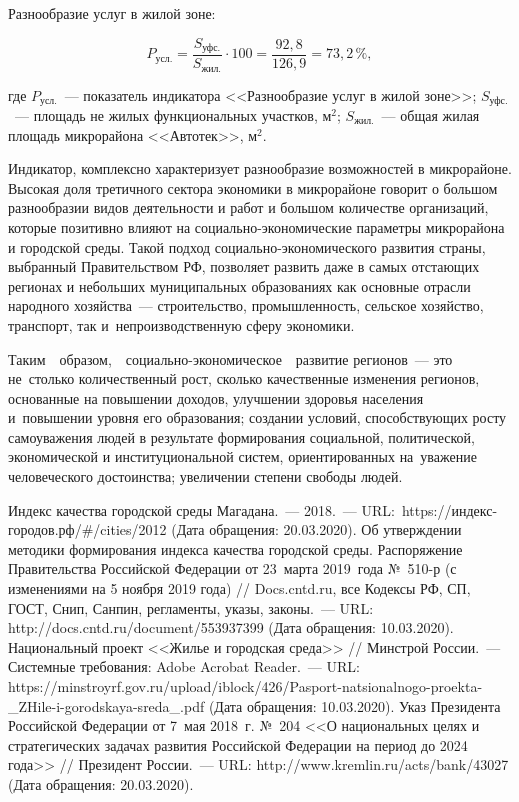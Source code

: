Разнообразие услуг в жилой зоне:

$$ P_{\text{усл.}} = \frac{S_{\text{уфс.}}}{S_{\text{жил.}}}\cdot100 = \frac{92,8}{126,9} = 73,2\,\%,$$

где $P_{\text{усл.}}$~--- показатель индикатора <<Разнообразие услуг в жилой зоне>>;
$S_{\text{уфс.}}$~--- площадь не жилых функциональных участков, м$^2$;
$S_{\text{жил.}}$~--- общая жилая площадь микрорайона <<Автотек>>, м$^2$.

Индикатор, комплексно характеризует разнообразие возможностей в микрорайоне. Высокая доля третичного сектора экономики в микрорайоне говорит о большом разнообразии видов деятельности и работ и большом количестве организаций, которые позитивно влияют на социально-экономические параметры микрорайона и городской среды. Такой подход социально-экономического развития страны, выбранный Правительством РФ, позволяет развить даже в самых отстающих регионах и небольших муниципальных образованиях как основные отрасли народного хозяйства~--- строительство, промышленность, сельское хозяйство, транспорт, так и~непроизводственную сферу экономики.

Таким\ \ образом,\ \ социально-экономическое\ \ развитие регионов~--- это не~столько количественный рост, сколько качественные изменения регионов, основанные на повышении доходов, улучшении здоровья населения и~повышении уровня его образования; создании условий, способствующих росту самоуважения людей в результате формирования социальной, политической, экономической и институциональной систем, ориентированных на~уважение человеческого достоинства; увеличении степени свободы людей.


\begin{thebibliography}{99}
\bibitem{}Индекс качества городской среды Магадана.~--- 2018.~--- URL:~https://индекс-городов.рф/\#/cities/2012 (Дата обращения: 20.03.2020).
\bibitem{}Об утверждении методики формирования индекса качества городской среды. Распоряжение Правительства Российской Федерации от 23~марта 2019~года №~510-р (с изменениями на 5 ноября 2019 года) // Docs.cntd.ru, все Кодексы РФ, СП, ГОСТ, Снип, Санпин, регламенты, указы, законы.~--- URL: http://docs.cntd.ru/document/553937399 (Дата обращения: 10.03.2020).
\bibitem{}Национальный проект <<Жилье и городская среда>> // Минстрой России.~--- Системные требования: Adobe Acrobat Reader.~--- URL: https://minstroyrf.gov.ru/upload/iblock/426/Pasport-natsionalnogo-proekta-\_ZHile-i-gorodskaya-sreda\_.pdf (Дата обращения: 10.03.2020).
\bibitem{}Указ Президента Российской Федерации от 7~мая 2018~г. №~204 <<О национальных целях и стратегических задачах развития Российской Федерации на период до 2024 года>> // Президент России.~--- URL: http://www.kremlin.ru/acts/bank/43027 (Дата обращения: 20.03.2020).

\end{thebibliography}
